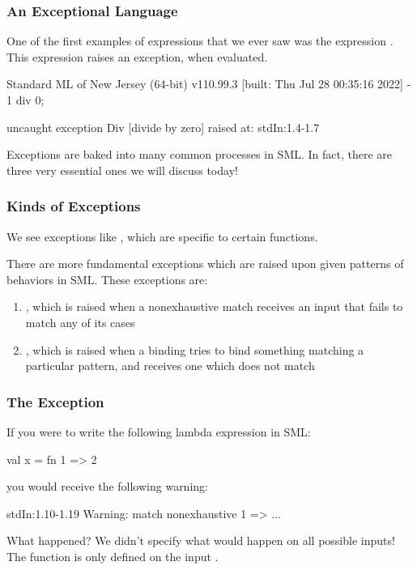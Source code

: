 \documentclass[aspectratio=169]{beamer}
\begin{document}
\begin{frame}[fragile]
  \frametitle{An Exceptional Language}

  One of the first examples of expressions that we ever saw was the 
  expression . This expression raises an exception, 
  when evaluated.

  \begin{codeblock}
    Standard ML of New Jersey (64-bit) v110.99.3 [built: Thu Jul 28 00:35:16 2022]
    - 1 div 0;

    uncaught exception Div [divide by zero]
      raised at: stdIn:1.4-1.7
  \end{codeblock}

  \vspace{\fill}

  Exceptions are baked into many common processes in SML. In fact, there are
  three very essential ones we will discuss today!
\end{frame}

\begin{frame}[fragile]
  \frametitle{Kinds of Exceptions}

  We see exceptions like , which are specific to certain functions.

  \vspace{\fill}

  There are more fundamental exceptions which are raised upon given patterns
  of behaviors in SML. These exceptions are:
  \begin{enumerate}
    \item {}, which is raised when a nonexhaustive match receives
    an input that fails to match any of its cases
    \item {}, which is raised when a  binding tries to
    bind something matching a particular pattern, and receives one which
    does not match
  \end{enumerate}
\end{frame}

\begin{frame}[fragile]
  \frametitle{The  Exception}

  If you were to write the following lambda expression in SML:
  \begin{codeblock}
    val x = fn 1 => 2
  \end{codeblock}

  you would receive the following warning:
  \begin{codeblock}
    stdIn:1.10-1.19 Warning: match nonexhaustive
              1 => ...
  \end{codeblock}

  \vspace{\fill}

  What happened? We didn't specify what would happen on all possible inputs!
  The function is only defined on the input .
\end{frame}
\end{document}
